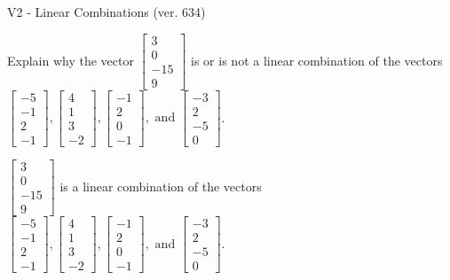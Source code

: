 \begin{exercise}
  \begin{exerciseTitle}V2 - Linear Combinations (ver. 634)\end{exerciseTitle}
  \begin{exerciseStatement}
    Explain why the vector \(\left[\begin{array}{c}
3 \\
0 \\
-15 \\
9
\end{array}\right]\)  is or is not a linear 
	combination of the vectors \(\left[\begin{array}{c}
-5 \\
-1 \\
2 \\
-1
\end{array}\right] , \left[\begin{array}{c}
4 \\
1 \\
3 \\
-2
\end{array}\right] , \left[\begin{array}{c}
-1 \\
2 \\
0 \\
-1
\end{array}\right] , \text{ and } \left[\begin{array}{c}
-3 \\
2 \\
-5 \\
0
\end{array}\right]\).
	


  \end{exerciseStatement}
  \begin{exerciseAnswer}
   \(\left[\begin{array}{c}
3 \\
0 \\
-15 \\
9
\end{array}\right]\) 
  	 is  
	a linear combination of the vectors \(\left[\begin{array}{c}
-5 \\
-1 \\
2 \\
-1
\end{array}\right] , \left[\begin{array}{c}
4 \\
1 \\
3 \\
-2
\end{array}\right] , \left[\begin{array}{c}
-1 \\
2 \\
0 \\
-1
\end{array}\right] , \text{ and } \left[\begin{array}{c}
-3 \\
2 \\
-5 \\
0
\end{array}\right]\).


\end{exerciseAnswer}
\end{exercise}
